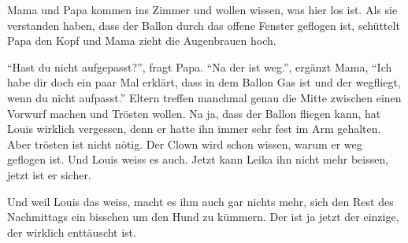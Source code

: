 Mama und Papa kommen ins Zimmer und wollen wissen, was hier los ist. Als sie verstanden haben, dass der Ballon durch das offene Fenster geflogen ist, schüttelt Papa den Kopf und Mama zieht die Augenbrauen hoch.

\enquote{Hast du nicht aufgepasst?}, fragt Papa. \enquote{Na der ist weg.}, ergänzt Mama, \enquote{Ich habe dir doch ein paar Mal erklärt, dass in dem Ballon Gas ist und der wegfliegt, wenn du nicht aufpasst.} Eltern treffen manchmal genau die Mitte zwischen einen Vorwurf machen und Trösten wollen. Na ja, dass der Ballon fliegen kann, hat Louis wirklich vergessen, denn er hatte ihn immer sehr fest im Arm gehalten. Aber trösten ist nicht nötig. Der Clown wird schon wissen, warum er weg geflogen ist. Und Louis weiss es auch. Jetzt kann Leika ihn nicht mehr beissen, jetzt ist er sicher.

Und weil Louis das weiss, macht es ihm auch gar nichts mehr, sich den Rest des Nachmittags ein bisschen um den Hund zu kümmern. Der ist ja jetzt der einzige, der wirklich enttäuscht ist.  \hfill {\color{DeepPink}\decofourleft}
